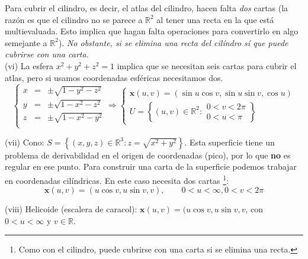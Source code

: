 \begin{mybox}
         Para cubrir el cilindro, es decir, el atlas del cilindro, hacen falta \emph{dos} cartas (la razón es que el cilindro no se parece a $\mathbb{R}^2$ al tener una recta en la que está multievaluada. Esto implica que hagan falta operaciones para convertirlo en algo semejante a $\mathbb{R}^2$). \emph{No obstante, si se elimina una recta del cilíndro sí que puede cubrirse con una carta.}\\

         (vi) La esfera $x^2+y^2+z^2=1$ implica que se necesitan seis cartas para cubrir el atlas, pero si usamos coordenadas esféricas necesitamos dos.
         $$
         \left \{ 
         \begin{array}{ccc}
             x &=& \pm \sqrt{1-y^2-z^2} \\
             y &=& \pm \sqrt{1-x^2-z^2} \\
             z &=& \pm \sqrt{1-x^2-y^2} \\
         \end{array}
         \right . \Longrightarrow\left \{
         \begin{array}{c}
              \mathbf{x}(u,v)=(\sin u \cos v, \sin u \sin v , \cos u)  \\
              U=\left \{ (u,v)\in \mathbb{R}^2:
              \begin{array}{c}
                   0<v<2\pi   \\
                   0<u<\pi 
              \end{array}
              \right \}
         \end{array} \right .
         $$


         (vii) Cono: $S=\left \{ (x,y,z)\in \mathbb{R}^3: z=\sqrt{x^2+y^2} \right \}$. Esta superficie tiene un problema de derivabilidad en el origen de coordenadas (pico), por lo que \textbf{no} es regular en ese punto. Para construir una carta de la superficie podemos trabajar en coordenadas cilíndricas. En este caso necesita dos cartas \footnote[1]{Como con el cilindro, puede cubrirse con una carta si se elimina una recta.}:
         $$
         \mathbf{x}(u,v)=(u\cos v, u\sin v , v), \qquad 0<u<\infty , 0<v<2\pi 
         $$

         (viii) Helicoide (escalera de caracol): $\mathbf{x}(u,v)=(u \cos v, u\sin v, v$, con $0<u<\infty $ y $v\in \mathbb{R}$.

\end{mybox}


